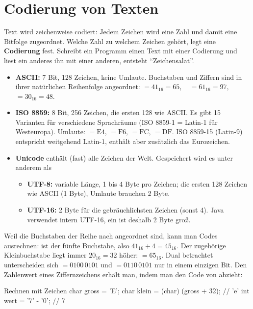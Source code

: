 \section{Codierung von Texten}\label{sec:zeichen}
\worum
Text wird zeichenweise codiert: Jedem Zeichen wird eine Zahl und damit eine Bitfolge zugeordnet. Welche Zahl zu welchem Zeichen gehört, legt eine \textbf{Codierung} fest. Schreibt ein Programm einen Text mit einer Codierung und liest ein anderes ihn mit einer anderen, entsteht \enquote{Zeichensalat}.

\begin{merke}
\begin{itemize}[itemsep=0.1em]
\item \textbf{ASCII:} 7 Bit, 128 Zeichen, keine Umlaute. Buchstaben und Ziffern sind in ihrer natürlichen Reihenfolge angeordnet:  $= 41_{16} = 65$, \  $= 61_{16} = 97$, \  $= 30_{16} = 48$.
\item \textbf{ISO 8859:} 8 Bit, 256 Zeichen, die ersten 128 wie ASCII. Es gibt 15 Varianten für verschiedene Sprachräume (ISO 8859-1 = Latin-1 für Westeuropa). Umlaute:  $= \mathrm{E4}$,  $= \mathrm{F6}$,  $= \mathrm{FC}$,  $= \mathrm{DF}$. ISO 8859-15 (Latin-9) entspricht weitgehend Latin-1, enthält aber zusätzlich das Eurozeichen.
\item \textbf{Unicode} enthält (fast) alle Zeichen der Welt. Gespeichert wird es unter anderem als
	\begin{itemize}[itemsep=0em]
	\item \textbf{UTF-8:} variable Länge, 1 bis 4 Byte pro Zeichen; die ersten 128 Zeichen wie ASCII (1 Byte), Umlaute brauchen 2 Byte.
	\item \textbf{UTF-16:} 2 Byte für die gebräuchlichsten Zeichen (sonst 4). Java verwendet intern UTF-16, ein  ist deshalb 2 Byte groß.
	\end{itemize}
\end{itemize}
\end{merke}

\beispiele
{}
Weil die Buchstaben der Reihe nach angeordnet sind, kann man Codes ausrechnen:  ist der fünfte Buchstabe, also $41_{16} + 4 = 45_{16}$. Der zugehörige Kleinbuchstabe liegt immer $20_{16} = 32$ höher:  $= 65_{16}$. Dual betrachtet unterscheiden sich  $= 0100\,0101$ und  $= 0110\,0101$ nur in einem einzigen Bit. Den Zahlenwert eines Ziffernzeichens erhält man, indem man den Code von  abzieht:
\begin{javacode}[Ausschnitt]{Rechnen mit Zeichen}
char gross = 'E';
char klein = (char) (gross + 32);     // 'e'
int wert = '7' - '0';                 // 7
\end{javacode}

